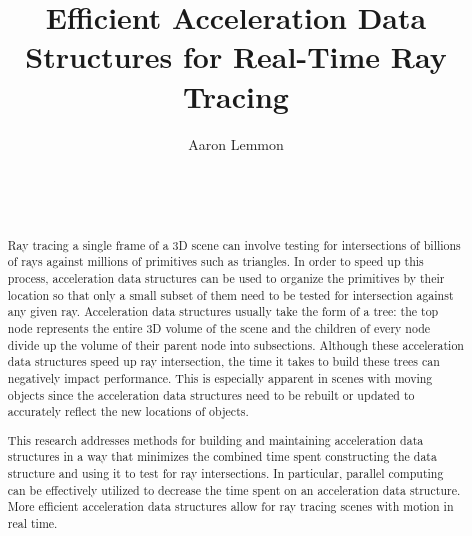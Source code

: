 \documentclass{sig-alternate}
\begin{document}

\title{Efficient Acceleration Data Structures for Real-Time Ray Tracing}


\author{
\alignauthor
Aaron Lemmon\\
	\\
	\\
	\\
}

\maketitle
\begin{abstract}


Ray tracing a single frame of a 3D scene can involve testing for intersections of billions of rays against millions of primitives such as triangles. In order to speed up this process, acceleration data structures can be used to organize the primitives by their location so that only a small subset of them need to be tested for intersection against any given ray. Acceleration data structures usually take the form of a tree: the top node represents the entire 3D volume of the scene and the children of every node divide up the volume of their parent node into subsections. Although these acceleration data structures speed up ray intersection, the time it takes to build these trees can negatively impact performance. This is especially apparent in scenes with moving objects since the acceleration data structures need to be rebuilt or updated to accurately reflect the new locations of objects.

This research addresses methods for building and maintaining acceleration data structures in a way that minimizes the combined time spent constructing the data structure and using it to test for ray intersections. In particular, parallel computing can be effectively utilized to decrease the time spent on an acceleration data structure. More efficient acceleration data structures allow for ray tracing scenes with motion in real time.
	
\end{abstract}
\end{document}
